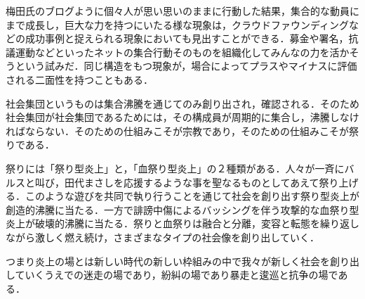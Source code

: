 \documentclass[uplatex,twocolumn,dvipdfmx]{jsarticle}
\begin{document}
梅田氏のブログように個々人が思い思いのままに行動した結果，集合的な動員にまで成長し，巨大な力を持つにいたる様な現象は，クラウドファウンディングなどの成功事例と捉えられる現象においても見出すことができる．募金や署名，抗議運動などといったネットの集合行動そのものを組織化してみんなの力を活かそうという試みだ．同じ構造をもつ現象が，場合によってプラスやマイナスに評価される二面性を持つこともある．

社会集団というものは集合沸騰を通じてのみ創り出され，確認される．そのため社会集団が社会集団であるためには，その構成員が周期的に集合し，沸騰しなければならない．そのための仕組みこそが宗教であり，そのための仕組みこそが祭りである．

祭りには「祭り型炎上」と，「血祭り型炎上」の２種類がある．人々が一斉にバルスと叫び，田代まさしを応援するような事を聖なるものとしてあえて祭り上げる．このような遊びを共同で執り行うことを通じて社会を創り出す祭り型炎上が創造的沸騰に当たる．一方で誹謗中傷によるバッシングを伴う攻撃的な血祭り型炎上が破壊的沸騰に当たる．祭りと血祭りは融合と分離，変容と転態を繰り返しながら激しく燃え続け，さまざまなタイプの社会像を創り出していく．

つまり炎上の場とは新しい時代の新しい枠組みの中で我々が新しく社会を創り出していくうえでの迷走の場であり，紛糾の場であり暴走と逡巡と抗争の場である．\nocite{BB17030175}



\end{document}
